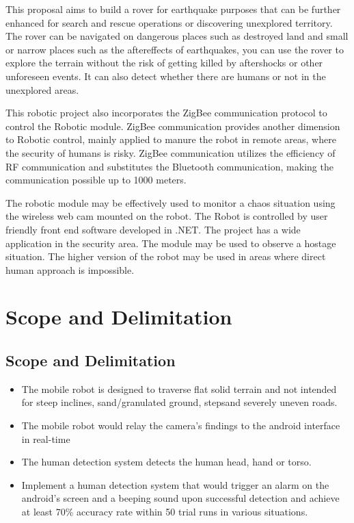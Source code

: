 This proposal aims to build a rover for earthquake purposes that can be further enhanced for search and rescue operations or discovering unexplored territory. The rover can be navigated on dangerous places such as destroyed land and small or narrow places such as the aftereffects of earthquakes, you can use the rover to explore the terrain without the risk of getting killed by aftershocks or other unforeseen events. It can also detect whether there are humans or not in the unexplored areas.

This robotic project also incorporates the ZigBee communication protocol to control the Robotic module. ZigBee communication provides another dimension to Robotic control, mainly applied to manure the robot in remote areas, where the security of humans is risky. ZigBee communication utilizes the efficiency of RF communication and substitutes the Bluetooth communication, making the communication possible up to 1000 meters.

The robotic module may be effectively used to monitor a chaos situation using the wireless web cam mounted on the robot. The Robot is controlled by user friendly front end software developed in .NET. The project has a wide application in the security area. The module may be used to observe a hostage situation. The higher version of the robot may be used in areas where direct human approach is impossible.

\section{Scope and Delimitation}
\subsection{Scope and Delimitation}
\begin{itemize}
		\item	The mobile robot is designed to traverse flat solid terrain and not intended for steep inclines, sand/granulated ground, steps\stairs and severely uneven roads.
\item	The mobile robot would relay the camera's findings to the android interface in real-time
\item	The human detection system detects the human head, hand or torso.
\item	Implement a human detection system that would trigger an alarm on the android's screen and a beeping sound upon successful detection and achieve at least 70\% accuracy rate within 50 trial runs in various situations.
\end{itemize}

